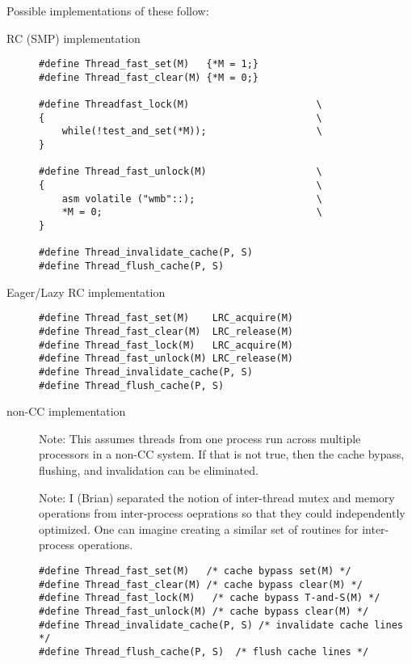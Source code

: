 Possible implementations of these follow:
\begin{description}
\item[RC (SMP) implementation]

\begin{verbatim}
#define Thread_fast_set(M)   {*M = 1;}
#define Thread_fast_clear(M) {*M = 0;}

#define Threadfast_lock(M)                      \
{                                               \
    while(!test_and_set(*M));                   \
}

#define Thread_fast_unlock(M)                   \
{                                               \
    asm volatile ("wmb"::);                     \
    *M = 0;                                     \
}

#define Thread_invalidate_cache(P, S)
#define Thread_flush_cache(P, S)
\end{verbatim}

\item[Eager/Lazy RC implementation]

\begin{verbatim}
#define Thread_fast_set(M)    LRC_acquire(M)
#define Thread_fast_clear(M)  LRC_release(M)
#define Thread_fast_lock(M)   LRC_acquire(M)
#define Thread_fast_unlock(M) LRC_release(M)
#define Thread_invalidate_cache(P, S)
#define Thread_flush_cache(P, S)
\end{verbatim}

\item[non-CC implementation]

Note: This assumes threads from one process run across multiple
processors in a non-CC system.  If that is not true, then the cache
bypass, flushing, and invalidation can be eliminated.

Note: I (Brian) separated the notion of inter-thread mutex and memory
operations 
from inter-process oeprations so that they could independently
optimized.  One can  imagine creating a similar set of routines for
inter-process operations.

\begin{verbatim}
#define Thread_fast_set(M)   /* cache bypass set(M) */
#define Thread_fast_clear(M) /* cache bypass clear(M) */
#define Thread_fast_lock(M)   /* cache bypass T-and-S(M) */
#define Thread_fast_unlock(M) /* cache bypass clear(M) */
#define Thread_invalidate_cache(P, S) /* invalidate cache lines */
#define Thread_flush_cache(P, S)  /* flush cache lines */
\end{verbatim}

\end{description}

